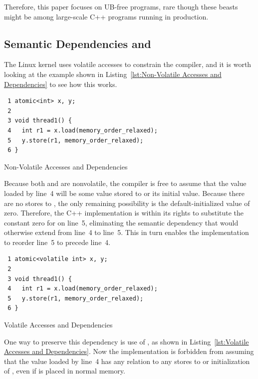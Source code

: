 \documentclass[10]{article}
\begin{document}
Therefore, this paper focuses on UB-free programs, rare though these
beasts might be among large-scale C++ programs running in production.

\subsection{Semantic Dependencies and }
\label{app:Semantic Dependencies and volatile}

The Linux kernel uses volatile accesses to constrain the compiler,
and it is worth looking at the example shown in
Listing~\ref{lst:Non-Volatile Accesses and Dependencies}
to see how this works.

\begin{listing}
\begin{verbatim}
 1 atomic<int> x, y;
 2
 3 void thread1() {
 4   int r1 = x.load(memory_order_relaxed);
 5   y.store(r1, memory_order_relaxed);
 6 }
\end{verbatim}
\caption{Non-Volatile Accesses and Dependencies}
\label{lst:Non-Volatile Accesses and Dependencies}
\end{listing}

Because both  and  are nonvolatile, the compiler is
free to assume that the value loaded by line~4 will be some value
stored to  or its initial value.
Because there are no stores to , the only remaining possibility
is the default-initialized value of zero.
Therefore, the C++ implementation is within its rights to substitute
the constant zero for  on line~5, eliminating the semantic
dependency that would otherwise extend from line~4 to line~5.
This in turn enables the implementation to reorder line~5 to
precede line~4.

\begin{listing}
\begin{verbatim}
 1 atomic<volatile int> x, y;
 2
 3 void thread1() {
 4   int r1 = x.load(memory_order_relaxed);
 5   y.store(r1, memory_order_relaxed);
 6 }
\end{verbatim}
\caption{Volatile Accesses and Dependencies}
\label{lst:Volatile Accesses and Dependencies}
\end{listing}

One way to preserve this dependency is use of , as shown in
Listing~\ref{lst:Volatile Accesses and Dependencies}.
Now the implementation is forbidden from assuming that the value loaded
by line~4 has any relation to any stores to or initialization of ,
even if  is placed in normal memory.
\end{document}
